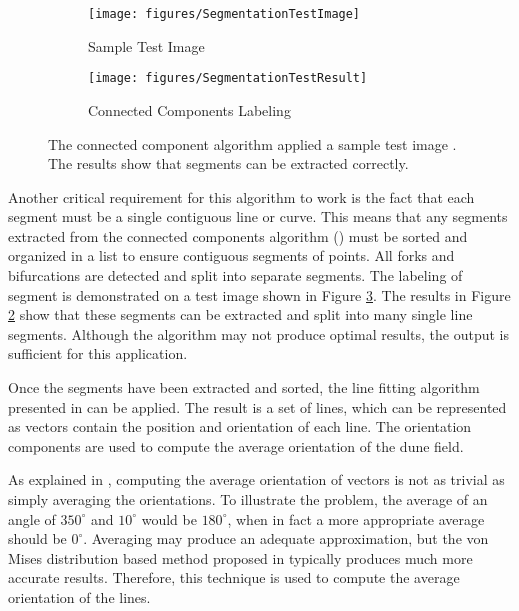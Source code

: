 \begin{figure}
	\centering
	\begin{subfigure}{0.48\textwidth}
		\centering
		\texttt{[image: figures/SegmentationTestImage]}
		\caption{Sample Test Image}
		\label{fig:connected_component_test_image}
	\end{subfigure}
	\begin{subfigure}{0.48\textwidth}
		\centering
		\texttt{[image: figures/SegmentationTestResult]}
		\caption{Connected Components Labeling}
		\label{fig:connected_component_test_results}
	\end{subfigure}
	
	\caption{ The connected component algorithm applied a sample test image . The results  show that segments can be extracted correctly. }
	\label{fig:connected_component_test}
\end{figure}

Another critical requirement for this algorithm to work is the fact that each segment must be a single contiguous line or curve. This means that any segments extracted from the connected components algorithm (\cite{connected-components-samet-tamminen-1988-paper,connected-components-dillencourt-1992-paper}) must be sorted and organized in a list to ensure contiguous segments of points. All forks and bifurcations are detected and split into separate segments. The labeling of segment is demonstrated on a test image shown in Figure \ref{fig:connected_component_test}. The results in Figure \ref{fig:connected_component_test_results} show that these segments can be extracted and split into many single line segments. Although the algorithm may not produce optimal results, the output is sufficient for this application.

Once the segments have been extracted and sorted, the line fitting algorithm presented in \cite{ramer-1972-paper} can be applied. The result is a set of lines, which can be represented as vectors contain the position and orientation of each line. The orientation components are used to compute the average orientation of the dune field.

As explained in \cite{computing-average-orientation-of-vectors}, computing the average orientation of vectors is not as trivial as simply averaging the orientations. To illustrate the problem, the average of an angle of $350^{\circ}$ and $10^{\circ}$ would be $180^{\circ}$, when in fact a more appropriate average should be $0^{\circ}$. Averaging may produce an adequate approximation, but the von Mises distribution based method proposed in \cite{computing-average-orientation-of-vectors} typically produces much more accurate results. Therefore, this technique is used to compute the average orientation of the lines.

